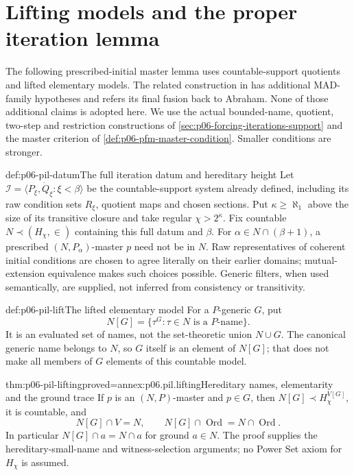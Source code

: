 \section{Lifting models and the proper iteration lemma}
\label{sec:p06-proper-iteration-lemma}

The following prescribed-initial master lemma uses countable-support
quotients and lifted elementary models. The related construction in
\cite[Proposition~6.4, pp.~158--159]{GuzmanHrusakTellez2020RestrictedMAD}
has additional MAD-family hypotheses and refers its final fusion back to
Abraham. None of those additional claims is adopted here. We use the
actual bounded-name, quotient, two-step and restriction constructions of
\cref{sec:p06-forcing-iterations-support} and the master criterion of
\cref{def:p06-pfm-master-condition}. Smaller conditions are stronger.

\begin{hbconvention}{def:p06-pil-datum}{The full iteration datum and hereditary height}
Let \(\mathcal I=\langle P_\xi,\dot Q_\xi:\xi<\beta\rangle\) be
the countable-support system already defined, including its raw condition
sets \(R_\xi\), quotient maps and chosen sections. Put
\(\kappa\geq\aleph_1\) above the size of its transitive closure and
take regular \(\chi>2^\kappa\). Fix countable
\(N\prec(H_\chi,\in)\) containing this full datum and \(\beta\).
For \(\alpha\in N\cap(\beta+1)\), a prescribed
\((N,P_\alpha)\)-master \(p\) need not be in \(N\).
Raw representatives of coherent initial conditions are chosen to agree
literally on their earlier domains; mutual-extension equivalence makes
such choices possible. Generic filters, when used semantically, are
supplied, not inferred from consistency or transitivity.
\end{hbconvention}

\begin{hbdefinition}{def:p06-pil-lift}{The lifted elementary model}
For a \(P\)-generic \(G\), put
\[
 N[G]=\{\tau^G:\tau\in N\text{ is a }P\text{-name}\}.
\]
It is an evaluated set of names, not the set-theoretic union \(N\cup G\).
The canonical generic name belongs to \(N\), so \(G\) itself is an
element of \(N[G]\); that does not make all members of \(G\) elements
of this countable model.
\end{hbdefinition}

\begin{hblemma}{thm:p06-pil-lifting}{proved=annex:p06.pil.lifting}{Hereditary names, elementarity and the ground trace}
If \(p\) is an \((N,P)\)-master and \(p\in G\), then
\(N[G]\prec H_\chi^{V[G]}\), it is countable, and
\[
 N[G]\cap V=N,\qquad N[G]\cap\operatorname{Ord}=N\cap\operatorname{Ord}.
\]
In particular \(N[G]\cap a=N\cap a\) for ground \(a\in N\).
The proof supplies the hereditary-small-name and witness-selection
arguments; no Power Set axiom for \(H_\chi\) is assumed.
\end{hblemma}

